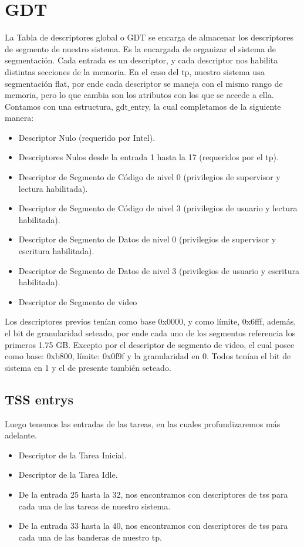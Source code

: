 
\section{GDT}
\par{La Tabla de descriptores global o GDT se encarga de almacenar los descriptores de segmento de nuestro sistema. Es la encargada de organizar el sistema de segmentación.
Cada entrada es un descriptor, y cada descriptor nos habilita distintas secciones de la memoria. En el caso del tp, nuestro sistema usa segmentación flat, por ende cada descriptor se maneja con el mismo rango de memoria, pero lo que cambia son los atributos con los que se accede a ella.
Contamos con una estructura, gdt$\_$entry, la cual completamos de la siguiente manera:
\begin{itemize}
\item Descriptor Nulo (requerido por Intel).
\item Descriptores Nulos desde la entrada 1 hasta la 17 (requeridos por el tp).
\item Descriptor de Segmento de Código de nivel 0 (privilegios de supervisor y lectura habilitada).
\item Descriptor de Segmento de Código de nivel 3 (privilegios de usuario y lectura habilitada).
\item Descriptor de Segmento de Datos de nivel 0 (privilegios de supervisor y escritura habilitada).
\item Descriptor de Segmento de Datos de nivel 3 (privilegios de usuario y escritura habilitada).
\item Descriptor de Segmento de video 
\end{itemize}
\medskip
\par{Los descriptores previos tenían como base 0x0000, y como límite, 0x6fff, además, el bit de granularidad seteado, por ende cada uno de los segmentos referencia los primeros 1.75 GB. Excepto por el descriptor de segmento de video, el cual posee como base: 0xb800, límite: 0x0f9f y la granularidad en 0.
Todos tenían el bit de sistema en 1 y el de presente también seteado.
}
\medskip

\subsection{TSS entrys}
Luego tenemos las entradas de las tareas, en las cuales profundizaremos más adelante.
\begin{itemize}
\item Descriptor de la Tarea Inicial.
\item Descriptor de la Tarea Idle.
\item De la entrada 25 hasta la 32, nos encontramos con descriptores de tss para cada una de las tareas de nuestro sistema.
\item De la entrada 33 hasta la 40, nos encontramos con descriptores de tss para cada una de las banderas de nuestro tp.
\end{itemize}


}
